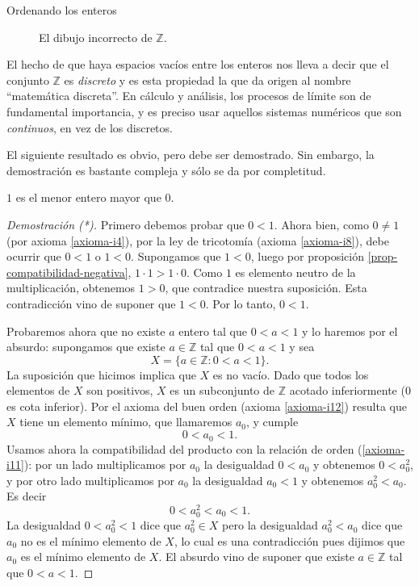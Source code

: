 \begin{section}{Ordenando los enteros}
\begin{figure}[ht]    
    \begin{center}
    \end{center}
    \caption{El dibujo incorrecto de $\mathbb Z$.}\label{f1.3}
\end{figure}

El hecho de que haya espacios vacíos entre los enteros nos lleva a decir que el conjunto $\mathbb Z$ es \textit{discreto} y es esta propiedad la que da origen al nombre ``matemática discreta''. En cálculo y análisis, los procesos de límite son de fundamental importancia, y es preciso usar aquellos sistemas numéricos que son \textit{continuos}, en vez de los discretos.

El siguiente resultado es obvio, pero  debe ser demostrado. Sin embargo,  la demostración es bastante compleja y sólo se da por completitud. 
\begin{proposicion}\label{prop-0-menor-que-1}
$1$ es el menor entero mayor que $0$.
\end{proposicion}
\begin{proof}[Demostración (*)] Primero debemos probar que $0 < 1$. Ahora bien, como $0 \not= 1$ (por axioma \ref{axioma-i4}), por la ley de tricotomía (axioma \ref{axioma-i8}), debe ocurrir que $0 < 1$ o $ 1 < 0$. Supongamos que $1 < 0$, luego por proposición \ref{prop-compatibilidad-negativa}, $1 \cdot 1 > 1 \cdot 0$. Como $1$  es elemento neutro de la multiplicación, obtenemos $1 > 0$, que contradice nuestra suposición. Esta contradicción vino de suponer que $1 < 0$. Por lo tanto, $0 < 1$.

Probaremos ahora que no existe $a$ entero tal que $ 0<a<1$ y lo haremos por el absurdo: supongamos que existe $a \in \mathbb Z$ tal que $0<a<1$ y sea 
$$
X=\{a\in\mathbb Z: 0<a<1\}.
$$
La  suposición que hicimos implica que $X$ es no vacío.  Dado que todos los elementos de $X$ son positivos, $X$ es un subconjunto de $\mathbb Z$ acotado inferiormente ($0$ es cota inferior). Por el axioma del buen orden (axioma \ref{axioma-i12}) resulta que $X$ tiene un elemento mínimo, que llamaremos $a_0$, y cumple
$$
0<a_0<1. 
$$
Usamos ahora la compatibilidad del  producto con  la relación de orden (\ref{axioma-i11}):  por un lado multiplicamos por $a_0$ la desigualdad $0<a_0$ y obtenemos $0<a_0^2$,  y por otro lado multiplicamos por $a_0$ la desigualdad $a_0<1$ y obtenemos $a_0^2<a_0$. Es decir
$$
 0<a_0^2<a_0<1.
$$
La desigualdad $0<a_0^2<1$ dice que $a_0^2\in X$ pero la desigualdad $a_0^2<a_0$ dice que  $a_0$ no es el mínimo elemento de $X$, lo cual es una contradicción pues dijimos que $a_0$ es el mínimo elemento de $X$.  El  absurdo  vino de suponer que existe $a \in \mathbb Z$ tal que   $0<a<1$.
\end{proof}



\end{section}
